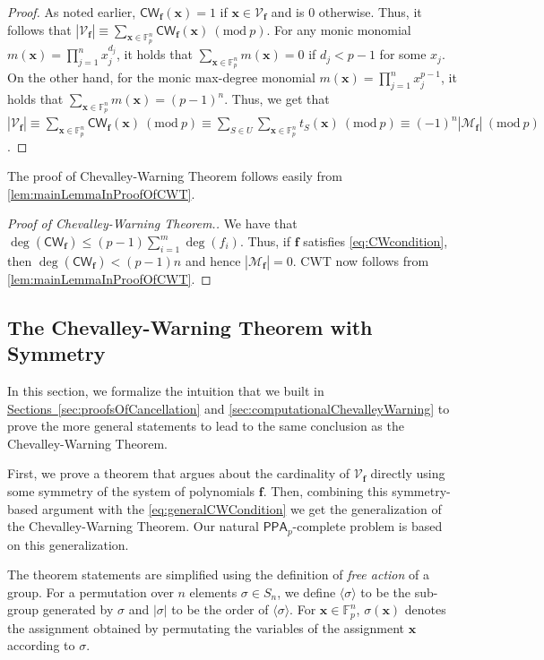 \documentclass[10pt,a4paper]{article}
\theoremstyle{definition}
\theoremstyle{remark}
\let\boldm\bm
\newcommand{\inparen}[1]{\left ( #1 \right )}
\renewcommand{\mod}[1]{~\inparen{\mathrm{mod}~#1}}
\newcommand{\bx}{{\boldm x}}
\def\abs#1{\left|#1\right|}
\newcommand{\bbF}{\ensuremath{\mathbb{F}}}
\newcommand{\calM}{\mathcal{M}}
\newcommand{\calV}{\mathcal{V}}
\newcommand{\vecf}{\ensuremath{\boldsymbol{f}}}
\newcommand{\vecx}{\ensuremath{\boldsymbol{x}}}
\newcommand{\class}[1]{\ensuremath{\mathsf{#1}}\xspace}
\newcommand{\PPA}{\class{PPA}}
\newcommand{\CWT}{CWT\xspace}
\newcommand{\CW}{\mathsf{CW}}
\begin{document}
\begin{proof}
As noted earlier, $\CW_{\vecf}(\vecx) = 1$ if $\bx \in \calV_{\vecf}$ and is $0$ otherwise. Thus, it follows that $\abs{\calV_{\vecf}} \equiv \sum_{\bx \in \bbF_p^n} \CW_{\vecf}(\bx) \mod{p}$. For any monic monomial $m(\bx) = \prod_{j=1}^n x_j^{d_j}$, it holds that $\sum_{\bx \in \bbF_p^n} m(\bx) = 0$ if $d_j < p - 1$ for some $x_j$. On the other hand, for the monic max-degree monomial $m(\bx) = \prod_{j = 1}^n x_j^{p-1}$, it holds that $\sum_{\bx \in \bbF_p^n} m(\bx) = (p-1)^n$. Thus, we get that $|\calV_{\vecf}| \equiv \sum_{\bx \in \bbF_p^n} \CW_{\vecf}(\bx) \mod{p} \equiv \sum_{S\in U} \sum_{\bx \in \bbF_p^n} t_S(\vecx)  \mod{p} \equiv (-1)^n |\calM_{\vecf}| \mod{p}$.
\end{proof}

\noindent The proof of Chevalley-Warning Theorem follows easily from
\autoref{lem:mainLemmaInProofOfCWT}.

\begin{proof}[Proof of Chevalley-Warning Theorem.]
We have that $\deg(\CW_{\vecf}) \le (p - 1) \sum_{i = 1}^m \deg(f_i)$. Thus, if $\vecf$ satisfies \eqref{eq:CWcondition}, then $\deg(\CW_{\vecf}) < (p - 1) n$ and hence $\abs{\calM_{\vecf}} = 0$. \CWT now follows from \autoref{lem:mainLemmaInProofOfCWT}.
\end{proof}

\subsection{The Chevalley-Warning Theorem with Symmetry}
\label{sec:ChevalleyWarningWithSymmetry}

  In this section, we formalize the intuition that we built in
\hyperref[sec:proofsOfCancellation]{Sections~\ref{sec:proofsOfCancellation}} and \ref{sec:computationalChevalleyWarning} to prove the more general
statements to lead to the same conclusion as the Chevalley-Warning
Theorem.

  First, we prove a theorem that argues about the cardinality of $\calV_{\vecf}$
directly using some symmetry of the system of polynomials $\vecf$. Then,
combining this symmetry-based argument with the \eqref{eq:generalCWCondition} we get
the generalization of the Chevalley-Warning Theorem. Our natural
$\PPA_p$-complete problem is based on this generalization.

The theorem statements are simplified using the definition of
\textit{free action} of a group. For a permutation over $n$ elements $\sigma \in S_n$, we define
$\langle \sigma \rangle$ to be the sub-group generated by $\sigma$ and
$|\sigma|$ to be the order of $\langle\sigma \rangle$. For $\vecx \in \bbF_p^n$, $\sigma(\vecx)$ denotes the assignment obtained by permutating the variables of the assignment $\vecx$ according to $\sigma$.
\end{document}
